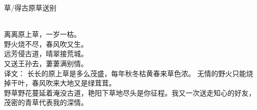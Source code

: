 \noindent 草/得古原草送别

  \\

\noindent 离离原上草，一岁一枯。\\
野火烧不尽，春风吹又生。\\
\noindent 远芳侵古道，晴翠接荒城。\\
又送王孙去，萋萋满别情。\\

译文：
长长的原上草是多么茂盛，每年秋冬枯黄春来草色浓。
无情的野火只能烧掉干叶，春风吹来大地又是绿茸茸。\\
野草野花蔓延着淹没古道，艳阳下草地尽头是你征程。我又一次送走知心的好友，茂密的青草代表我的深情。